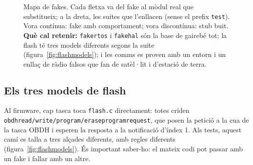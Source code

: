 \documentclass[11pt,a4paper]{article}
\DeclareRobustCommand{\_}{\textunderscore\allowbreak}
\newcommand{\cd}[1]{\texttt{#1}}
\newenvironment{slidefig}{\begin{landscape}\thispagestyle{plain}\begin{figure}[p]\centering}{\end{figure}\end{landscape}}
\begin{document}
\begin{slidefig}
\caption{Mapa de fakes. Cada fletxa va del fake al mòdul real que substitueix; a la dreta, les suites
que l'enllacen (sense el prefix \cd{test\_}). Vora contínua: fake amb comportament; vora discontínua:
stub buit. \textbf{Què cal retenir:} \cd{fake\_rtos} i \cd{fake\_hal} són la base de gairebé tot; la flash
té tres models diferents segons la suite (figura~\ref{fig:flashmodels}); i les comms es proven amb un
entorn i un enllaç de ràdio falsos que fan de satèl·lit i d'estació de terra.}
\label{fig:fakes}
\end{slidefig}

\subsection{Els tres models de flash}

Al firmware, cap tasca toca \cd{flash.c} directament: totes criden
\cd{obdh\_read/write/program/erase\_program\_request}, que posen la petició a la cua de la
tasca OBDH i esperen la resposta a la notificació d'índex 1. Als tests, aquest camí es
talla a tres alçades diferents, amb regles diferents (figura~\ref{fig:flashmodels}). És
important saber-ho: el mateix codi pot passar amb un fake i fallar amb un altre.
\end{document}
